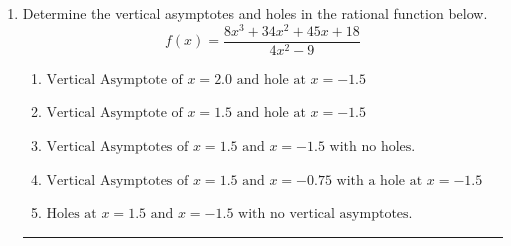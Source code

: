 \documentclass[14pt]{extbook}
\newcommand{\litem}[1]{\item#1\hspace*{-1cm}\rule{\textwidth}{0.4pt}}
\begin{document}
\begin{enumerate}
{\begin{enumerate}[label=\Alph*.]
\end{enumerate} }
\litem{
Determine the vertical asymptotes and holes in the rational function below.\[ f(x) = \frac{8x^{3} +34 x^{2} +45 x + 18}{4x^{2} -9} \]\begin{enumerate}[label=\Alph*.]
\item \( \text{Vertical Asymptote of } x = 2.0 \text{ and hole at } x = -1.5 \)
\item \( \text{Vertical Asymptote of } x = 1.5 \text{ and hole at } x = -1.5 \)
\item \( \text{Vertical Asymptotes of } x = 1.5 \text{ and } x = -1.5 \text{ with no holes.} \)
\item \( \text{Vertical Asymptotes of } x = 1.5 \text{ and } x = -0.75 \text{ with a hole at } x = -1.5 \)
\item \( \text{Holes at } x = 1.5 \text{ and } x = -1.5 \text{ with no vertical asymptotes.} \)

\end{enumerate} }
\end{enumerate}
\end{document}
